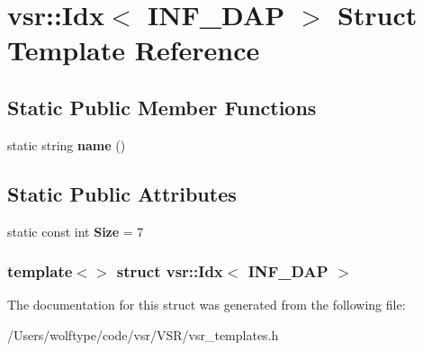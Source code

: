 \hypertarget{structvsr_1_1_idx_3_01_i_n_f___d_a_p_01_4}{\section{vsr\-:\-:Idx$<$ I\-N\-F\-\_\-\-D\-A\-P $>$ Struct Template Reference}
\label{structvsr_1_1_idx_3_01_i_n_f___d_a_p_01_4}
}
\subsection*{Static Public Member Functions}
\begin{DoxyCompactItemize}
\item 
\hypertarget{structvsr_1_1_idx_3_01_i_n_f___d_a_p_01_4_a87eacc280075517a29ef1503aaa88f3a}{static string {\bfseries name} ()}\label{structvsr_1_1_idx_3_01_i_n_f___d_a_p_01_4_a87eacc280075517a29ef1503aaa88f3a}

\end{DoxyCompactItemize}
\subsection*{Static Public Attributes}
\begin{DoxyCompactItemize}
\item 
\hypertarget{structvsr_1_1_idx_3_01_i_n_f___d_a_p_01_4_a3da3975ba94a6b144602f73fad8327ee}{static const int {\bfseries Size} = 7}\label{structvsr_1_1_idx_3_01_i_n_f___d_a_p_01_4_a3da3975ba94a6b144602f73fad8327ee}

\end{DoxyCompactItemize}
\subsubsection*{template$<$$>$ struct vsr\-::\-Idx$<$ I\-N\-F\-\_\-\-D\-A\-P $>$}



The documentation for this struct was generated from the following file\-:\begin{DoxyCompactItemize}
\item 
/\-Users/wolftype/code/vsr/\-V\-S\-R/vsr\-\_\-templates.\-h\end{DoxyCompactItemize}
